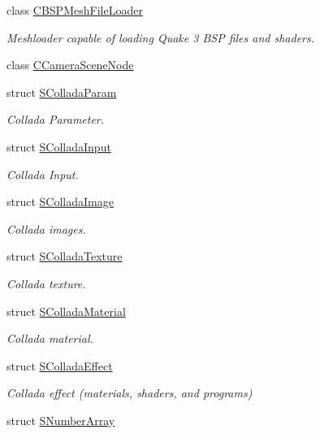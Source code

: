\begin{DoxyCompactItemize}
\item 
class \hyperlink{classirr_1_1scene_1_1_c_b_s_p_mesh_file_loader}{C\-B\-S\-P\-Mesh\-File\-Loader}
\begin{DoxyCompactList}\small\item\em Meshloader capable of loading Quake 3 B\-S\-P files and shaders. \end{DoxyCompactList}\item 
class \hyperlink{classirr_1_1scene_1_1_c_camera_scene_node}{C\-Camera\-Scene\-Node}
\item 
struct \hyperlink{structirr_1_1scene_1_1_s_collada_param}{S\-Collada\-Param}
\begin{DoxyCompactList}\small\item\em Collada Parameter. \end{DoxyCompactList}\item 
struct \hyperlink{structirr_1_1scene_1_1_s_collada_input}{S\-Collada\-Input}
\begin{DoxyCompactList}\small\item\em Collada Input. \end{DoxyCompactList}\item 
struct \hyperlink{structirr_1_1scene_1_1_s_collada_image}{S\-Collada\-Image}
\begin{DoxyCompactList}\small\item\em Collada images. \end{DoxyCompactList}\item 
struct \hyperlink{structirr_1_1scene_1_1_s_collada_texture}{S\-Collada\-Texture}
\begin{DoxyCompactList}\small\item\em Collada texture. \end{DoxyCompactList}\item 
struct \hyperlink{structirr_1_1scene_1_1_s_collada_material}{S\-Collada\-Material}
\begin{DoxyCompactList}\small\item\em Collada material. \end{DoxyCompactList}\item 
struct \hyperlink{structirr_1_1scene_1_1_s_collada_effect}{S\-Collada\-Effect}
\begin{DoxyCompactList}\small\item\em Collada effect (materials, shaders, and programs) \end{DoxyCompactList}\item 
struct \hyperlink{structirr_1_1scene_1_1_s_number_array}{S\-Number\-Array}

\end{DoxyCompactItemize}
